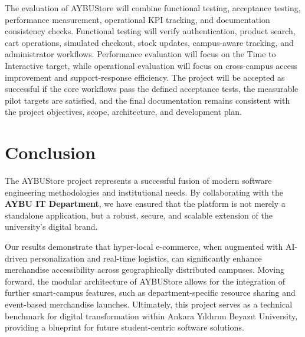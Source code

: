 \documentclass[11pt,a4paper]{article}
\begin{document}
The evaluation of AYBUStore will combine functional testing,
acceptance testing, performance measurement, operational KPI tracking,
and documentation consistency checks. Functional testing will verify
authentication, product search, cart operations, simulated checkout,
stock updates, campus-aware tracking, and administrator workflows.
Performance evaluation will focus on the Time to Interactive target,
while operational evaluation will focus on cross-campus access
improvement and support-response efficiency. The project will be
accepted as successful if the core workflows pass the defined
acceptance tests, the measurable pilot targets are satisfied, and the
final documentation remains consistent with the project objectives,
scope, architecture, and development plan.


\section{Conclusion}
The AYBUStore project represents a successful fusion of modern software engineering methodologies and institutional needs. By collaborating with the \textbf{AYBU IT Department}, we have ensured that the platform is not merely a standalone application, but a robust, secure, and scalable extension of the university's digital brand.

Our results demonstrate that hyper-local e-commerce, when augmented with AI-driven personalization and real-time logistics, can significantly enhance merchandise accessibility across geographically distributed campuses. Moving forward, the modular architecture of AYBUStore allows for the integration of further smart-campus features, such as department-specific resource sharing and event-based merchandise launches. Ultimately, this project serves as a technical benchmark for digital transformation within Ankara Yıldırım Beyazıt University, providing a blueprint for future student-centric software solutions.

\newpage
\end{document}
